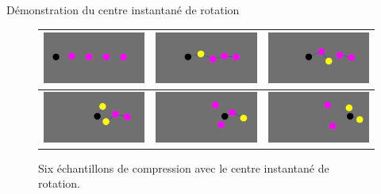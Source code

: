 \documentclass{beamer}
\begin{document}
\begin{frame}{Démonstration du centre instantané de rotation}
  \begin{figure}
    \begin{center}
    \begin{tabular}{|M|M|M|}
      \hline
      \includegraphics[width=3.5cm]{Images/cir_1.png} &
      \includegraphics[width=3.5cm]{Images/cir_2.png} &
      \includegraphics[width=3.5cm]{Images/cir_3.png} \\
      \hline
      \includegraphics[width=3.5cm]{Images/cir_4.png} &
      \includegraphics[width=3.5cm]{Images/cir_5.png} &
      \includegraphics[width=3.5cm]{Images/cir_6.png} \\
      \hline
    \end{tabular}
    \end{center}
    \caption{Six échantillons de compression avec le centre instantané de rotation.}
  \end{figure}
\end{frame}
\end{document}
